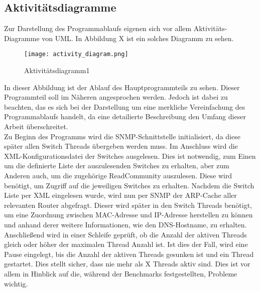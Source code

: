 \subsection{Aktivitätsdiagramme}
\label{subsec:acitvitydiagrams}

Zur Darstellung des Programmablaufs eigenen sich vor allem Aktivitäts-Diagramme von UML.
In Abbildung X ist ein solches Diagramm zu sehen.\\

\begin{figure}[H]
\centering
\texttt{[image: activity\_diagram.png]}
\caption{Aktivitätsdiagramm1}
\label{fig:activitydiagram1}
\end{figure}

In dieser Abbildung ist der Ablauf des Hauptprogrammteils zu sehen. Dieser Programmteil soll im Näheren angesprochen werden.
Jedoch ist dabei zu beachten, das es sich bei der Darstellung um eine merkliche Vereinfachung des Programmablaufs handelt, da eine detailierte Beschreibung den Umfang dieser Arbeit überschreitet.\\
Zu Beginn des Programms wird die SNMP-Schnittstelle initialisiert, da diese später allen Switch Threads übergeben werden muss.
Im Anschluss wird die XML-Konfigurationsdatei der Switches ausgelesen.
Dies ist notwendig, zum Einen um die definierte Liste der auszulesenden Switches zu erhalten, aber zum Anderen auch, um die zugehörige ReadCommunity auszulesen.
Diese wird benötigt, um Zugriff auf die jeweiligen Switches zu erhalten.
Nachdem die Switch Liste per XML eingelesen wurde, wird nun per SNMP der ARP-Cache aller relevanten Router abgefragt.
Dieser wird später in den Switch Threads benötigt, um eine Zuordnung zwischen MAC-Adresse und IP-Adresse herstellen zu können und anhand derer weitere Informationen, wie den DNS-Hostname, zu erhalten.
Anschließend wird in einer Schleife geprüft, ob die Anzahl der aktiven Threads gleich oder höher der maximalen Thread Anzahl ist.
Ist dies der Fall, wird eine Pause eingelegt, bis die Anzahl der aktiven Threads gesunken ist und ein Thread gestartet.
Dies stellt sicher, dass nie mehr als X Threads aktiv sind.
Dies ist vor allem in Hinblick auf die, während der Benchmarks festgestellten, Probleme wichtig.

